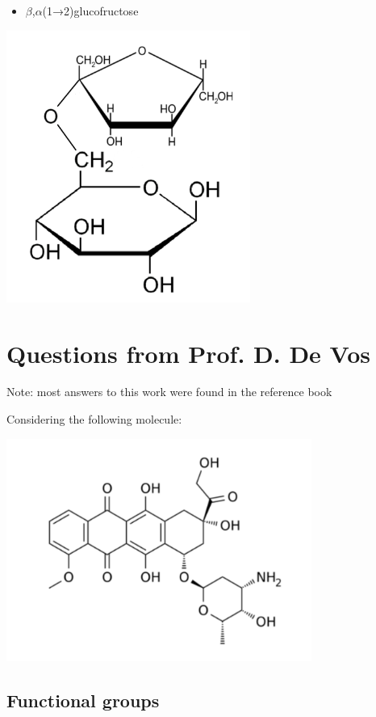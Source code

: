 \documentclass[11pt, a4paper,titlepage]{article}
\begin{document}
\begin{itemize}
\item $\beta$,$\alpha$(1→2)glucofructose
\end{itemize}

\includegraphics[width=8cm]{./Figures/BA(1-2)GlucoFructose2.pdf}
\section{Questions from Prof. D. De Vos}
\label{sec-3}

Note: most answers to this work were found in the reference
book \cite{BioChemBlei}

Considering the following molecule:

\includegraphics[width=10cm]{./Figures/Part3MoleculeRaw.pdf}
\subsection{Functional groups}
\label{sec-3-1}
\end{document}
